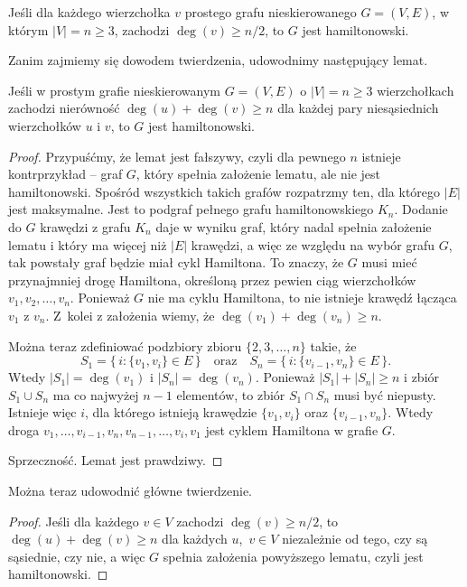 \subproblem %
\begin{twierdzenie}[Dirac]
	Jeśli dla każdego wierzchołka $v$ prostego grafu nieskierowanego $G=(V,E)$, w którym $|V|=n\ge3$, zachodzi $\deg(v)\ge n/2$, to $G$ jest hamiltonowski.
\end{twierdzenie}
Zanim zajmiemy się dowodem twierdzenia, udowodnimy następujący lemat.
\begin{lemat}[Ore]
	Jeśli w prostym grafie nieskierowanym $G=(V,E)$ o $|V|=n\ge3$ wierzchołkach zachodzi nierówność $\deg(u)+\deg(v)\ge n$ dla każdej pary niesąsiednich wierzchołków $u$ i $v$, to $G$ jest hamiltonowski.
\end{lemat}
\begin{proof}
Przypuśćmy, że lemat jest fałszywy, czyli dla pewnego $n$ istnieje kontrprzykład -- graf $G$, który spełnia założenie lematu, ale nie jest hamiltonowski. Spośród wszystkich takich grafów rozpatrzmy ten, dla którego $|E|$ jest maksymalne. Jest to podgraf pełnego grafu hamiltonowskiego $K_n$. Dodanie do $G$ krawędzi z grafu $K_n$ daje w wyniku graf, który nadal spełnia założenie lematu i który ma więcej niż $|E|$ krawędzi, a więc ze względu na wybór grafu $G$, tak powstały graf będzie miał cykl Hamiltona. To znaczy, że $G$ musi mieć przynajmniej drogę Hamiltona, określoną przez pewien ciąg wierzchołków $v_1,v_2,\dots,v_n$. Ponieważ $G$ nie ma cyklu Hamiltona, to nie istnieje krawędź łącząca $v_1$ z $v_n$. Z~kolei z założenia wiemy, że $\deg(v_1)+\deg(v_n)\ge n$.

Można teraz zdefiniować podzbiory zbioru $\{2,3,\dots,n\}$ takie, że
\[
	S_1 = \bigl\{\,i:\{v_1,v_i\}\in E\,\bigr\} \quad\text{oraz}\quad S_n = \bigl\{\,i:\{v_{i-1},v_n\}\in E\,\bigr\}.
\]
Wtedy $|S_1|=\deg(v_1)$ i $|S_n|=\deg(v_n)$. Ponieważ $|S_1|+|S_n|\ge n$ i zbiór $S_1\cup S_n$ ma co najwyżej $n-1$ elementów, to zbiór $S_1\cap S_n$ musi być niepusty. Istnieje więc $i$, dla którego istnieją krawędzie $\{v_1,v_i\}$ oraz $\{v_{i-1},v_n\}$. Wtedy droga $v_1,\dots,v_{i-1},v_n,v_{n-1},\dots,v_i,v_1$ jest cyklem Hamiltona w grafie $G$.

Sprzeczność. Lemat jest prawdziwy.
\end{proof}

Można teraz udowodnić główne twierdzenie.
\begin{proof}
Jeśli dla każdego $v\in V$ zachodzi $\deg(v)\ge n/2$, to $\deg(u)+\deg(v)\ge n$ dla każdych $u$,~$v\in V$ niezależnie od tego, czy są sąsiednie, czy nie, a więc $G$ spełnia założenia powyższego lematu, czyli jest hamiltonowski.
\end{proof}

